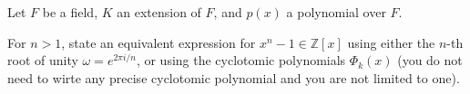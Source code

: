\documentclass{exam}
\begin{document}
\centering
{}
\vspace{1em}

\begin{questions}
    \question[3]
        Let $F$ be a field, $K$ an extension of $F$, and $p(x)$ a polynomial over $F$.
    \question[2]
        For $n>1$, state an equivalent expression for $x^n-1\in\mathbb{Z}[x]$ using either the $n$-th root of unity $\omega = e^{2\pi i/n}$, 
        or using the cyclotomic polynomials $\Phi_k(x)$ (you do not need to wirte any precise cyclotomic polynomial and you are not limited to one).
\end{questions}
\end{document}
